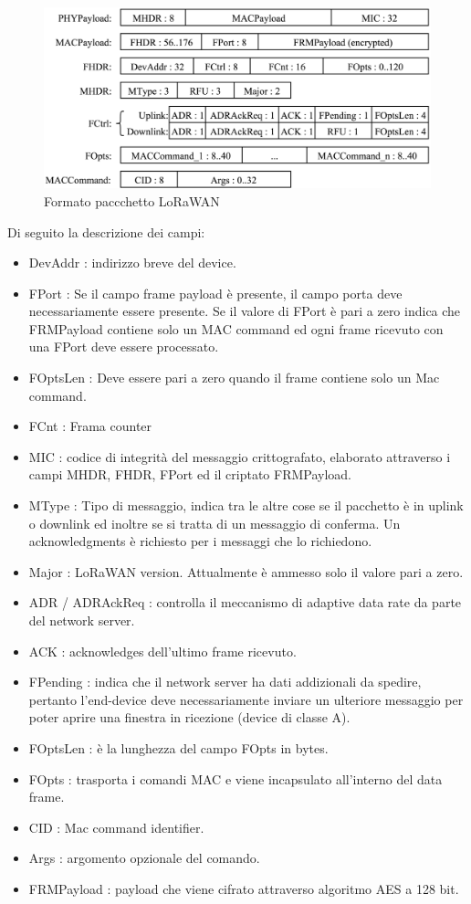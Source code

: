 \documentclass[12pt,a4paper,openright,twoside]{report}
\begin{document}
\begin{figure}[h]                      
\begin{center} 
\includegraphics[width=\textwidth]{lorawan_message_format.png} 
\caption[Formato paccchetto LoRaWAN]{Formato paccchetto LoRaWAN}\label{fig:venti}
\end{center}
\end{figure}

Di seguito la descrizione dei campi:
\begin{itemize}                       
\item DevAddr : indirizzo breve del device.
\item FPort : Se il campo frame payload \`e presente, il campo porta deve necessariamente essere presente. Se il valore di FPort \`e pari a zero indica che FRMPayload contiene solo un MAC command ed ogni frame ricevuto con una FPort deve essere processato.
\item FOptsLen : Deve essere pari a zero quando il frame contiene solo un Mac command. 
\item FCnt : Frama counter
\item MIC : codice di integrit\`a del messaggio crittografato, elaborato attraverso i campi MHDR, FHDR, FPort ed il criptato FRMPayload.
\item MType : Tipo di messaggio, indica tra le altre cose se il pacchetto \`e in uplink o downlink ed inoltre se si tratta di un messaggio di conferma. Un acknowledgments \`e richiesto per i messaggi che lo richiedono.
\item Major : LoRaWAN version. Attualmente \`e ammesso solo il valore pari a zero. 
\item ADR / ADRAckReq : controlla il meccanismo di adaptive data rate da parte del network server. 
\item ACK : acknowledges dell'ultimo frame ricevuto. 
\item FPending : indica che il network server ha dati addizionali da spedire, pertanto l'end-device deve necessariamente inviare un ulteriore messaggio per poter aprire una finestra in ricezione (device di classe A).
\item FOptsLen : \`e la lunghezza del campo FOpts in bytes. 
\item FOpts : trasporta i comandi MAC e viene incapsulato all'interno del data frame.
\item CID : Mac command identifier.
\item Args : argomento opzionale del comando.
\item FRMPayload : payload che viene cifrato attraverso algoritmo AES a 128 bit.
\end{itemize}
\end{document}
